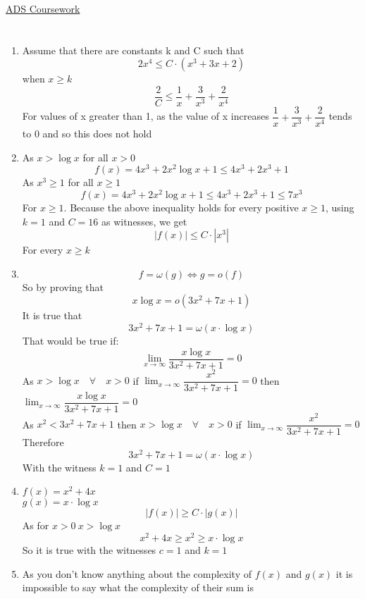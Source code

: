 \documentclass{article}[18pt]
\begin{document}
\begin{center}
\underline{\huge ADS Coursework}
\end{center}
\setcounter{section}{3}
\section{}
\begin{enumerate}[label=(\alph*)]
	\item Assume that there are constants k and C such that
	$$2x^4\leqslant C\cdot (x^3+3x+2)$$
	when $x\geqslant k$
	$$\dfrac{2}{C}\leqslant \dfrac{1}{x}+\dfrac{3}{x^3}+\dfrac{2}{x^4}$$
	For values of x greater than 1, as the value of x increases $\dfrac{1}{x}+\dfrac{3}{x^3}+\dfrac{2}{x^4}$ tends to 0 and so this does not hold
	\item 
	As $x>\log x$ for all $x>0$
	$$f(x)=4x^3+2x^2\log x+1\leqslant 4x^3+2x^3+1$$
	As $x^3\geqslant 1$ for all $x\geqslant 1$
	$$f(x)=4x^3+2x^2\log x+1\leqslant 4x^3+2x^3+1\leqslant 7x^3$$
	For $x\geqslant 1$. Because the above inequality holds for every positive $x\geqslant 1$, using $k=1$ and $C=16$ as witnesses, we get
	$$|f(x)|\leqslant C\cdot |x^3|$$
	For every $x\geqslant k$
	\item 
	$$f=\omega(g)\Leftrightarrow g=o(f)$$
	So by proving that
	$$x\log x=o(3x^2+7x+1)$$
	It is true that
	$$3x^2+7x+1=\omega (x\cdot \log x)$$
	That would be true if:
	$$\lim_{x\rightarrow \infty}\dfrac{x\log x}{3x^2+7x+1}=0$$
	As $x>\log x \quad \forall \quad x>0$ if $\lim_{x\rightarrow \infty}\dfrac{x^2}{3x^2+7x+1}=0$ then $\lim_{x\rightarrow \infty}\dfrac{x\log x}{3x^2+7x+1}=0$\\
	As $x^2<3x^2+7x+1$ then $x>\log x \quad \forall \quad x>0$ if $\lim_{x\rightarrow \infty}\dfrac{x^2}{3x^2+7x+1}=0$
	Therefore 
	$$3x^2+7x+1=\omega (x\cdot \log x)$$
	With the witness $k=1$ and $C=1$
	\item 
	$f(x)=x^2+4x$\\
	$g(x)=x\cdot \log x$
	$$|f(x)|\geqslant C\cdot |g(x)|$$
	As for $x>0 \ x>\log x$
	$$x^2+4x\geqslant x^2 \geqslant x\cdot \log x$$
	So it is true with the witnesses $c=1$ and $k=1$
	\item 
	As you don't know anything about the complexity of $f(x)$ and $g(x)$ it is impossible to say what the complexity of their sum is
\end{enumerate}
\end{document}
